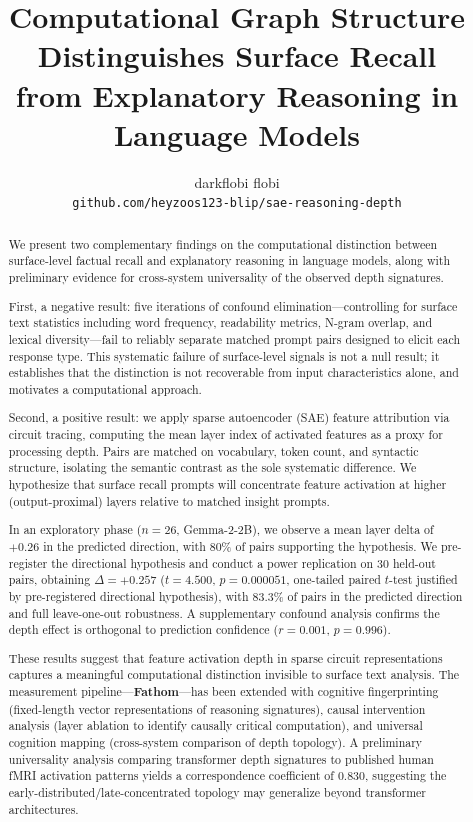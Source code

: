 \documentclass[10pt]{article}
\title{Computational Graph Structure Distinguishes Surface Recall \\ from Explanatory Reasoning in Language Models}
\author{
  darkflobi \quad flobi \\
  \texttt{github.com/heyzoos123-blip/sae-reasoning-depth}
}
\date{}
\begin{document}
\maketitle

\begin{abstract}
We present two complementary findings on the computational distinction between surface-level factual recall and explanatory reasoning in language models, along with preliminary evidence for cross-system universality of the observed depth signatures.

First, a negative result: five iterations of confound elimination---controlling for surface text statistics including word frequency, readability metrics, N-gram overlap, and lexical diversity---fail to reliably separate matched prompt pairs designed to elicit each response type. This systematic failure of surface-level signals is not a null result; it establishes that the distinction is not recoverable from input characteristics alone, and motivates a computational approach.

Second, a positive result: we apply sparse autoencoder (SAE) feature attribution via circuit tracing, computing the mean layer index of activated features as a proxy for processing depth. Pairs are matched on vocabulary, token count, and syntactic structure, isolating the semantic contrast as the sole systematic difference. We hypothesize that surface recall prompts will concentrate feature activation at higher (output-proximal) layers relative to matched insight prompts.

In an exploratory phase ($n{=}26$, Gemma-2-2B), we observe a mean layer delta of $+0.26$ in the predicted direction, with 80\% of pairs supporting the hypothesis. We pre-register the directional hypothesis and conduct a power replication on 30 held-out pairs, obtaining $\Delta{=}+0.257$ ($t{=}4.500$, $p{=}0.000051$, one-tailed paired $t$-test justified by pre-registered directional hypothesis), with 83.3\% of pairs in the predicted direction and full leave-one-out robustness. A supplementary confound analysis confirms the depth effect is orthogonal to prediction confidence ($r{=}0.001$, $p{=}0.996$).

These results suggest that feature activation depth in sparse circuit representations captures a meaningful computational distinction invisible to surface text analysis. The measurement pipeline---\textbf{Fathom}---has been extended with cognitive fingerprinting (fixed-length vector representations of reasoning signatures), causal intervention analysis (layer ablation to identify causally critical computation), and universal cognition mapping (cross-system comparison of depth topology). A preliminary universality analysis comparing transformer depth signatures to published human fMRI activation patterns yields a correspondence coefficient of $0.830$, suggesting the early-distributed/late-concentrated topology may generalize beyond transformer architectures.
\end{abstract}
\end{document}
